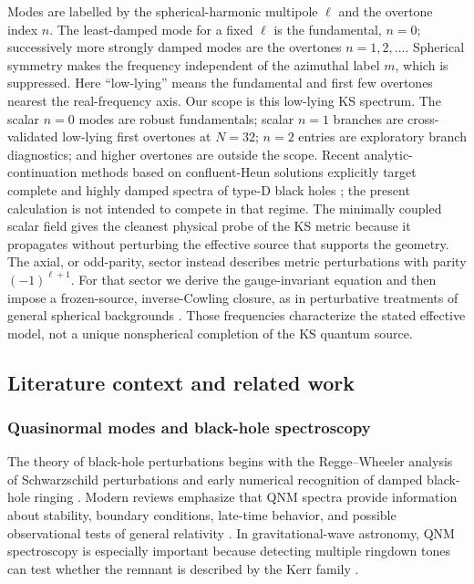 \documentclass[12pt,a4paper]{article}
\begin{document}
\color{blue}
Modes are labelled by the spherical-harmonic multipole \(\ell\) and the
overtone index \(n\).  The least-damped mode for a fixed \(\ell\) is the
fundamental, \(n=0\); successively more strongly damped modes are the
overtones \(n=1,2,\ldots\).  Spherical symmetry makes the frequency independent
of the azimuthal label \(m\), which is suppressed.  Here ``low-lying'' means
the fundamental and first few overtones nearest the real-frequency axis.  Our
scope is this low-lying KS spectrum. The
scalar \(n=0\) modes are robust fundamentals; scalar \(n=1\)
branches are cross-validated low-lying first overtones at \(N=32\); \(n=2\) entries are exploratory
branch diagnostics; and higher overtones are outside the scope.  Recent
analytic-continuation methods based on confluent-Heun solutions explicitly
target complete and highly damped spectra of type-D black holes
\cite{Chen2025}; the present calculation is not intended to compete in that
regime. The minimally coupled scalar field gives the cleanest physical probe
of the KS metric because it propagates without perturbing the effective source
that supports the geometry.  The axial, or odd-parity, sector instead
describes metric perturbations with parity \((-1)^{\ell+1}\).  For that sector
we derive the gauge-invariant equation and then impose a frozen-source,
inverse-Cowling closure,
as in perturbative treatments of general spherical backgrounds
\cite{Gerlach1979,Gundlach1999,Karlovini2002}. Those frequencies characterize
the stated effective model, not a unique nonspherical completion of the KS
quantum source.
\color{black}

\subsection{Literature context and related work}

\subsubsection{Quasinormal modes and black-hole spectroscopy}

The theory of black-hole perturbations begins with the Regge--Wheeler analysis of Schwarzschild perturbations \cite{Regge1957} and early numerical recognition of damped black-hole ringing \cite{Vishveshwara1970}. Modern reviews emphasize that QNM spectra provide information about stability, boundary conditions, late-time behavior, and possible observational tests of general relativity \cite{Kokkotas1999,Berti2009,Konoplya2011}. In gravitational-wave astronomy, QNM spectroscopy is especially important because detecting multiple ringdown tones can test whether the remnant is described by the Kerr family \cite{Berti2006,Isi2019}.
\end{document}
